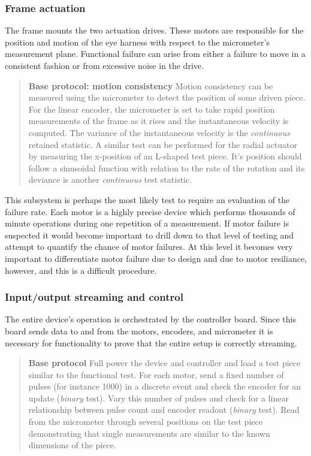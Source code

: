 \documentclass{article}
\begin{document}
\subsubsection{Frame actuation}
The frame mounts the two actuation drives. These motors are responsible for the position and motion of the eye harness with respect to the micrometer's measurement plane. Functional failure can arise from either a failure to move in a consistent fashion or from excessive noise in the drive.

\begin{quotation}
  \textbf{Base protocol: motion consistency} Motion consistency can be measured using the micrometer to detect the position of some driven piece. For the linear encoder, the micrometer is set to take rapid position measurements of the frame as it rises and the instantaneous velocity is computed. The variance of the instantaneous velocity is the \textit{continuous} retained statistic. A similar test can be performed for the radial actuator by measuring the x-position of an L-shaped test piece. It's position should follow a sinusoidal function with relation to the rate of the rotation and its deviance is another \textit{continuous} test statistic.
\end{quotation}

This subsystem is perhaps the most likely test to require an evaluation of the failure rate. Each motor is a highly precise device which performs thousands of minute operations during one repetition of a measurement. If motor failure is suspected it would become important to drill down to that level of testing and attempt to quantify the chance of motor failures. At this level it becomes very important to differentiate motor failure due to design and due to motor resiliance, however, and this is a difficult procedure.

\subsubsection{Input/output streaming and control}
The entire device's operation is orchestrated by the controller board. Since this board sends data to and from the motors, encoders, and micrometer it is necessary for functionality to prove that the entire setup is correctly streaming.

\begin{quotation}
  \textbf{Base protocol} Full power the device and controller and load   a test piece similar to the functional test. For each motor, send a   fixed number of pulses (for instance 1000) in a discrete event and   check the encoder for an update (\textit{binary} test). Vary this   number of pulses and check for a linear relationship between pulse   count and encoder readout (\textit{binary} test). Read from the   micrometer through several positions on the test piece demonstrating   that single measurements are similar to the known dimensions of the   piece.
\end{quotation}
\end{document}
